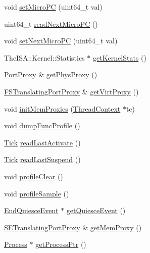 \begin{DoxyCompactItemize}
\item 
void \hyperlink{classInOrderThreadContext_a12ffdd4e1d5fbd2b5ed83f9ae70af0bb}{setMicroPC} (uint64\_\-t val)
\item 
uint64\_\-t \hyperlink{classInOrderThreadContext_aa2e28fd8a172666817bb94bf10fb2802}{readNextMicroPC} ()
\item 
void \hyperlink{classInOrderThreadContext_a6999c039aaa68770e67923328abde58c}{setNextMicroPC} (uint64\_\-t val)
\item 
TheISA::Kernel::Statistics $\ast$ \hyperlink{classInOrderThreadContext_a3faa5e314c06241296ab582bb891a06a}{getKernelStats} ()
\item 
\hyperlink{classPortProxy}{PortProxy} \& \hyperlink{classInOrderThreadContext_a01ed2104c846a24a0e18594d3a2f7de9}{getPhysProxy} ()
\item 
\hyperlink{classFSTranslatingPortProxy}{FSTranslatingPortProxy} \& \hyperlink{classInOrderThreadContext_a03a07ebd804051b18b69156c2fff36a3}{getVirtProxy} ()
\item 
void \hyperlink{classInOrderThreadContext_ab24719c7923d7d57030fa05bb166c62c}{initMemProxies} (\hyperlink{classThreadContext}{ThreadContext} $\ast$tc)
\item 
void \hyperlink{classInOrderThreadContext_a13fa12d1779a94a1e0b968946a1367c7}{dumpFuncProfile} ()
\item 
\hyperlink{base_2types_8hh_a5c8ed81b7d238c9083e1037ba6d61643}{Tick} \hyperlink{classInOrderThreadContext_afaa8f9eb8d809cccd31829ba793a433a}{readLastActivate} ()
\item 
\hyperlink{base_2types_8hh_a5c8ed81b7d238c9083e1037ba6d61643}{Tick} \hyperlink{classInOrderThreadContext_a7d0b0631c7087d361f6ae11379c06b15}{readLastSuspend} ()
\item 
void \hyperlink{classInOrderThreadContext_acf9c88860776d7bd752317e8b550a5d5}{profileClear} ()
\item 
void \hyperlink{classInOrderThreadContext_aba547b904bdcf83196f983f79d285caf}{profileSample} ()
\item 
\hyperlink{classEndQuiesceEvent}{EndQuiesceEvent} $\ast$ \hyperlink{classInOrderThreadContext_a0546f73d19db75274e9d0bc63c5f5908}{getQuiesceEvent} ()
\item 
\hyperlink{classSETranslatingPortProxy}{SETranslatingPortProxy} \& \hyperlink{classInOrderThreadContext_ab07f5af63c9d22e504dfe620c0a07228}{getMemProxy} ()
\item 
\hyperlink{classProcess}{Process} $\ast$ \hyperlink{classInOrderThreadContext_a4b26cb784639047bab9de2b306955c4b}{getProcessPtr} ()

\end{DoxyCompactItemize}
